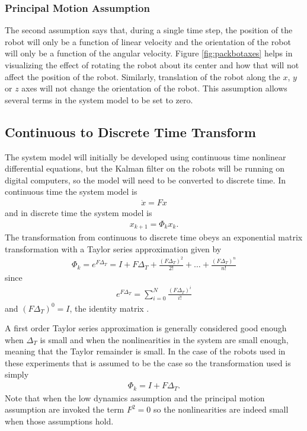 \subsubsection{Principal Motion Assumption}
\label{sec:kfPrincipalMotionAssumption}
The second assumption says that, during a single time step, the position of the robot will only be a function of linear velocity and the orientation of the robot will only be a function of the angular velocity. Figure \ref{fig:packbotaxes} helps in visualizing the effect of rotating the robot about its center and how that will not affect the position of the robot. Similarly, translation of the robot along the $x$, $y$ or $z$ axes will not change the orientation of the robot. This assumption allows several terms in the system model to be set to zero.

\subsection{Continuous to Discrete Time Transform}
\label{sec:kfContToDiscTransform}
The system model will initially be developed using continuous time nonlinear differential equations, but the Kalman filter on the robots will be running on digital computers, so the model will need to be converted to discrete time. In continuous time the system model is 
\begin{align*}
\dot{x} = Fx
\end{align*}
and in discrete time the system model is
\begin{align*}
x_{k+1} = \Phi_k x_k.
\end{align*}
The transformation from continuous to discrete time obeys an exponential matrix transformation with a Taylor series approximation given by \cite{Gelb74}
\begin{align*}
\Phi_k = e^{F\Delta_T} = I + F\Delta_T + \frac{(F\Delta_T)^2}{2!} + \ldots + \frac{(F\Delta_T)^n}{n!}
\end{align*}
since
\begin{align*}
e^{F\Delta_T} = \sum_{i=0}^N \frac{(F\Delta_T)^i}{i!}
\end{align*}
and $(F\Delta_T)^0=I$, the identity matrix \cite{Phadke99}.

A first order Taylor series approximation is generally considered good enough when $\Delta_T$ is small and when the nonlinearities in the system are small enough, meaning that the Taylor remainder is small. In the case of the robots used in these experiments that is assumed to be the case so the transformation used is simply
\begin{align}
\label{eq:kfContToDiscTransform}
\Phi_k = I + F\Delta_T.
\end{align}
Note that when the low dynamics assumption and the principal motion assumption are invoked the term $F^2=0$ so the nonlinearities are indeed small when those assumptions hold.

